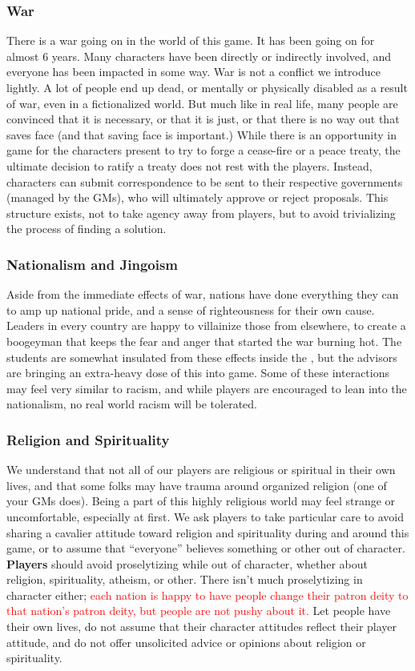 \documentclass[sheet]{GL2020}
\begin{document}
\subsubsection{War}
There is a war going on in the world of this game. It has been going on for almost 6 years. Many characters have been directly or indirectly involved, and everyone has been impacted in some way. War is not a conflict we introduce lightly. A lot of people end up dead, or mentally or physically disabled as a result of war, even in a fictionalized world. But much like in real life, many people are convinced that it is necessary, or that it is just, or that there is no way out that saves face (and that saving face is important.) While there is an opportunity in game for the characters present to try to forge a cease-fire or a peace treaty, the ultimate decision to ratify a treaty does not rest with the players. Instead, characters can submit correspondence to be sent to their respective governments (managed by the GMs), who will ultimately approve or reject proposals. This structure exists, not to take agency away from players, but to avoid trivializing the process of finding a solution. 

\subsubsection{Nationalism and Jingoism}
Aside from the immediate effects of war, nations have done everything they can to amp up national pride, and a sense of righteousness for their own cause. Leaders in every country are happy to villainize those from elsewhere, to create a boogeyman that keeps the fear and anger that started the war burning hot. The students are somewhat insulated from these effects inside the \pSchool{}, but the advisors are bringing an extra-heavy dose of this into game. Some of these interactions may feel very similar to racism, and while players are encouraged to lean into the nationalism, no real world racism will be tolerated.

\subsubsection{Religion and Spirituality}
We understand that not all of our players are religious or spiritual in their own lives, and that some folks may have trauma around organized religion (one of your GMs does). Being a part of this highly religious world may feel strange or uncomfortable, especially at first. We ask players to take particular care to avoid sharing a cavalier attitude toward religion and spirituality during and around this game, or to assume that ``everyone'' believes something or other out of character. \textbf{Players} should avoid proselytizing while out of character, whether about religion, spirituality, atheism, or other. There isn't much proselytizing in character either; \textcolor{red}{each nation is happy to have people change their patron deity to that nation's patron deity, but people are not pushy about it.} Let people have their own lives, do not assume that their character attitudes reflect their player attitude, and do not offer unsolicited advice or opinions about religion or spirituality.
\end{document}
